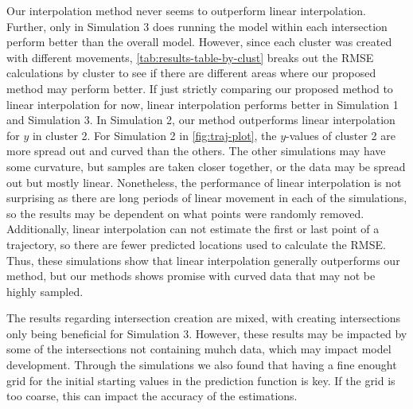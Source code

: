 \documentclass[12pt]{article}
\begin{document}
Our interpolation method never seems to outperform linear interpolation.
Further, only in Simulation 3 does running the model within each
intersection perform better than the overall model. However, since each
cluster was created with different movements,
\cref{tab:results-table-by-clust} breaks out the RMSE calculations by
cluster to see if there are different areas where our proposed method
may perform better. If just strictly comparing our proposed method to
linear interpolation for now, linear interpolation performs better in
Simulation 1 and Simulation 3. In Simulation 2, our method outperforms
linear interpolation for \(y\) in cluster 2. For Simulation 2 in
\cref{fig:traj-plot}, the \(y\)-values of cluster 2 are more spread out
and curved than the others. The other simulations may have some
curvature, but samples are taken closer together, or the data may be
spread out but mostly linear. Nonetheless, the performance of linear
interpolation is not surprising as there are long periods of linear
movement in each of the simulations, so the results may be dependent on
what points were randomly removed. Additionally, linear interpolation
can not estimate the first or last point of a trajectory, so there are
fewer predicted locations used to calculate the RMSE. Thus, these
simulations show that linear interpolation generally outperforms our
method, but our methods shows promise with curved data that may not be
highly sampled.

The results regarding intersection creation are mixed, with creating
intersections only being beneficial for Simulation 3. However, these
results may be impacted by some of the intersections not containing
muhch data, which may impact model development. Through the simulations
we also found that having a fine enought grid for the initial starting
values in the prediction function is key. If the grid is too coarse,
this can impact the accuracy of the estimations.
\end{document}
